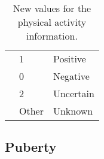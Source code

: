 \begin{table}[H]
\begin{tabular}{l | l | l}
                & \multicolumn{1}{l}{1}     & \multicolumn{1}{l}{Positive}  \\\cline{2-3}
                & \multicolumn{1}{l}{0}     & \multicolumn{1}{l}{Negative}  \\\cline{2-3}
                & \multicolumn{1}{l}{2}     & \multicolumn{1}{l}{Uncertain} \\\cline{2-3}
                & \multicolumn{1}{l}{Other} & \multicolumn{1}{l}{Unknown}   \\\hline

        \end{tabular}

    \caption{New values for the physical activity information.}

\end{table}

\subsection{Puberty}


